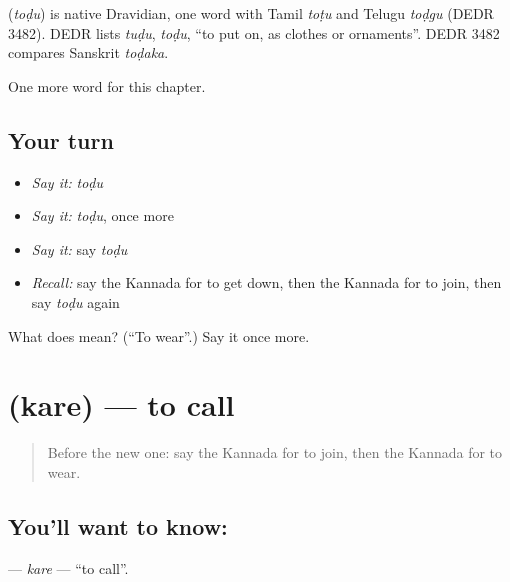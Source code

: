 \begin{cousinweb}
\textbf{} (\emph{toḍu}) is native Dravidian, one word with Tamil \emph{toṭu} and Telugu \emph{toḍgu} (DEDR 3482). DEDR lists \emph{tuḍu}, \emph{toḍu}, \textquotedblleft{}to put on, as clothes or ornaments\textquotedblright{}. DEDR 3482 compares Sanskrit \emph{toḍaka}.
\end{cousinweb}

\begin{grammarlens}[title={What you've built}]
One more word for this chapter.
\end{grammarlens}

\subsection*{Your turn}
\begin{itemize}
\raggedright
  \item \emph{Say it:} \emph{toḍu}
  \item \emph{Say it:} \emph{toḍu}, once more
  \item \emph{Say it:} say \emph{toḍu}
  \item \emph{Recall:} say the Kannada for to get down, then the Kannada for to join, then say \emph{toḍu} again
\end{itemize}

\begin{tcolorbox}[breakable,colback=teal!4,colframe=teal!35!black,title={Before you move on}]
What does  mean? (\textquotedblleft{}To wear\textquotedblright{}.) Say it once more.
\end{tcolorbox}
\section[\texorpdfstring{\kn{ಕರೆ} (kare)}{ಕರೆ (kare)}]{ (kare) — to call}

\label{lesson:KA-C149-kare}



\begin{quote}
Before the new one: say the Kannada for to join, then the Kannada for to wear.
\end{quote}

\subsection*{You'll want to know: }
\textbf{} — \emph{kare} — \textquotedblleft{}to call\textquotedblright{}.

